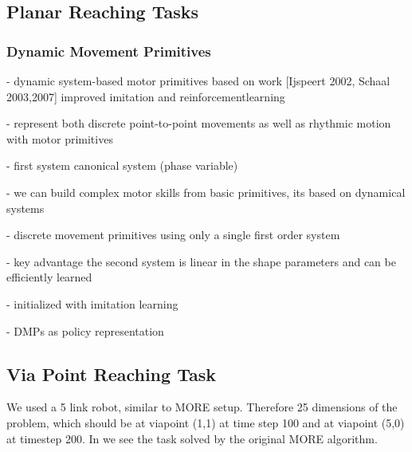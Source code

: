 
\subsection{Planar Reaching Tasks}

\subsubsection{Dynamic Movement Primitives}
- dynamic system-based motor primitives based on work [Ijspeert 2002, Schaal 2003,2007]
improved imitation and reinforcementlearning

- represent both discrete point-to-point movements as well as rhythmic motion
with motor primitives

- first system canonical system (phase variable)

- we can build complex motor skills from basic primitives,
  its based on dynamical systems

- discrete movement primitives using only a single first order system

- key advantage the second system is linear in the shape parameters and can
  be efficiently learned

- initialized with imitation learning

- DMPs as policy representation

\subsection{Via Point Reaching Task}
We used a 5 link robot, similar to MORE setup.
Therefore 25 dimensions of the problem, which should be at viapoint (1,1)
at time step 100 and at viapoint (5,0) at timestep 200.
In  we see the task solved by the original MORE algorithm.

